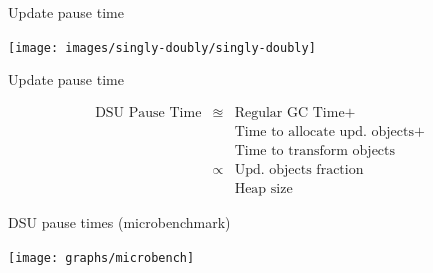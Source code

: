 \begin{frame}{Update pause time}%
\begin{center}\texttt{[image: images/singly-doubly/singly-doubly]}\end{center}
\end{frame}

\begin{frame}{Update pause time}%
\begin{large}
\begin{eqnarray*}
\text{DSU Pause Time} & \approxeq & \text{Regular GC Time} + \\ 
                      &           & \text{Time to allocate upd. objects} + \\
                      &           & \text{Time to transform objects} \\
                      & \propto   & \text{Upd. objects fraction} \\
                      &           & \text{Heap size}
\end{eqnarray*}
\end{large}
\end{frame}

\begin{frame}{DSU pause times (microbenchmark)}%
\begin{center}%
\texttt{[image: graphs/microbench]}%
\end{center}%
\end{frame}
